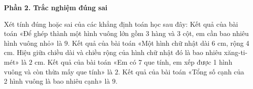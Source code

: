 \textbf{Phần 2. Trắc nghiệm đúng sai}

\begin{ex} %
Xét tính đúng hoặc sai của các khẳng định toán học sau đây:
\choiceTF
{\True Kết quả của bài toán «Để ghép thành một hình vuông lớn gồm 3 hàng và 3 cột, em cần bao nhiêu hình vuông nhỏ» là $9$.}
{\True Kết quả của bài toán «Một hình chữ nhật dài 6 cm, rộng 4 cm. Hiệu giữa chiều dài và chiều rộng của hình chữ nhật đó là bao nhiêu xăng-ti-mét» là $2\text{ cm}$.}
{Kết quả của bài toán «Em có 7 que tính, em xếp được 1 hình vuông và còn thừa mấy que tính» là $2$.}
{Kết quả của bài toán «Tổng số cạnh của 2 hình vuông là bao nhiêu cạnh» là $9$.}
\end{ex}

